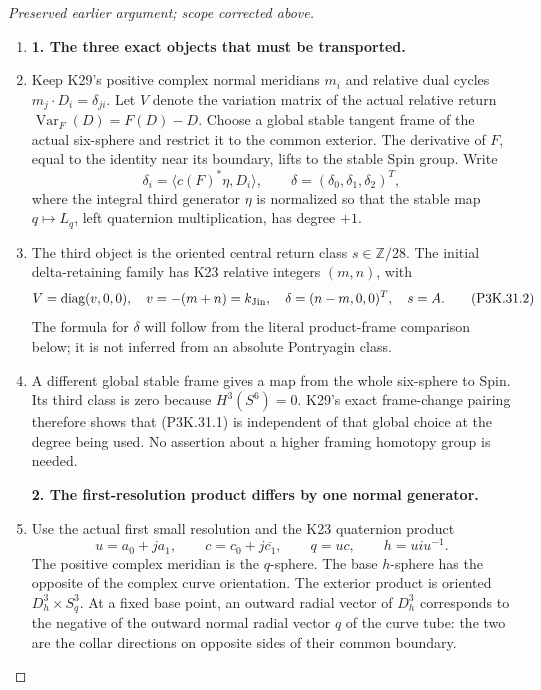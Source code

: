 \begin{proof}[Preserved earlier argument; scope corrected above]
\begin{enumerate}[label=\arabic*.]
\item \par\medskip\noindent\textbf{1. The three exact objects that must be transported.}\enspace

\item Keep K29's positive complex normal meridians \(m_i\) and relative
dual cycles \(m_j\cdot D_i=\delta_{ji}\). Let \(V\) denote the
variation matrix of the actual relative return
\(\operatorname{Var}_F(D)=F(D)-D\). Choose a global stable tangent
frame of the actual six-sphere and restrict it to the common exterior.
The derivative of \(F\), equal to the identity near its boundary,
lifts to the stable Spin group. Write
\[
 \delta_i=\langle c(F)^*\eta,D_i\rangle,\qquad
       \delta=(\delta_0,\delta_1,\delta_2)^T,
                                                        \tag{P3K.31.1}
\]
where the integral third generator \(\eta\) is normalized so that
the stable map \(q\mapsto L_q\), left quaternion multiplication,
has degree \(+1\).

\item The third object is the oriented central return class \(s\in\mathbb Z/28\).
The initial delta-retaining family has K23 relative integers
\((m,n)\), with
\[
       V=\operatorname{diag}(v,0,0),\quad
       v=-(m+n)=k_{\rm Jin},\quad
       \delta=(n-m,0,0)^T,\quad s=A.
                                                        \tag{P3K.31.2}
\]
The formula for \(\delta\) will follow from the literal product-frame
comparison below; it is not inferred from an absolute Pontryagin class.

\item A different global stable frame gives a map from the whole six-sphere
to Spin. Its third class is zero because \(H^3(S^6)=0\).
K29's exact frame-change pairing therefore shows that (P3K.31.1) is
independent of that global choice at the degree being used.
No assertion about a higher framing homotopy group is needed.

\par\medskip\noindent\textbf{2. The first-resolution product differs by one normal generator.}\enspace

\item Use the actual first small resolution and the K23 quaternion product
\[
 u=a_0+j a_1,\qquad
 c=c_0+j\overline{c_1},\qquad
 q=uc,\qquad h=u i u^{-1}.
                                                        \tag{P3K.31.3}
\]
The positive complex meridian is the \(q\)-sphere. The base
\(h\)-sphere has the opposite of the complex curve orientation.
The exterior product is oriented \(D^3_h\times S^3_q\).
At a fixed base point, an outward radial vector of \(D^3_h\)
corresponds to the negative of the outward normal radial
vector \(q\) of the curve tube: the two are the collar
directions on opposite sides of their common boundary.


\end{enumerate}
\end{proof}
